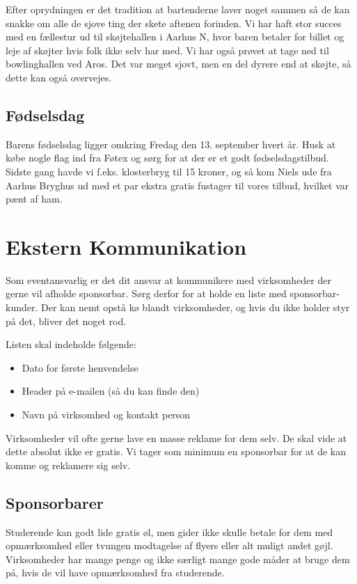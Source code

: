 Efter oprydningen er det tradition at bartenderne laver noget sammen så de kan snakke om alle de sjove ting der skete aftenen forinden. Vi har haft stor succes med en fællestur ud til skøjtehallen i Aarhus N, hvor baren betaler for billet og leje af skøjter hvis folk ikke selv har med. Vi har også prøvet at tage ned til bowlinghallen ved Aros. Det var meget sjovt, men en del dyrere end at skøjte, så dette kan også overvejes.

\subsection*{Fødselsdag}
Barens fødselsdag ligger omkring Fredag den 13. september hvert år. Husk at købe nogle flag ind fra Føtex og sørg for at der er et godt fødselsdagstilbud. Sidste gang havde vi f.eks. klosterbryg til 15 kroner, og så kom Niels ude fra Aarhus Bryghus ud med et par ekstra gratis fustager til vores tilbud, hvilket var pænt af ham.


\section*{Ekstern Kommunikation}
\label{sec:ekst-komm}

Som eventansvarlig er det dit ansvar at kommunikere med virksomheder
der gerne vil afholde sponsorbar. Sørg derfor for at holde en liste
med sponsorbar-kunder. Der kan nemt opstå kø blandt virksomheder, og
hvis du ikke holder styr på det, bliver det noget rod.

Listen skal indeholde følgende:
\begin{itemize}
\item Dato for første henvendelse
\item Header på e-mailen (så du kan finde den)
\item Navn på virksomhed og kontakt person
\end{itemize}

Virksomheder vil ofte gerne lave en masse reklame for dem selv. De skal vide at dette absolut ikke er gratis. Vi tager som minimum en sponsorbar for at de kan komme og reklamere sig selv.

\subsection{Sponsorbarer}
\label{sec:sponsorbarer}

Studerende kan godt lide gratis øl, men gider ikke skulle betale for
dem med opmærksomhed eller tvungen modtagelse af flyers eller alt
muligt andet gøjl. Virksomheder har mange penge og ikke særligt mange
gode måder at bruge dem på, hvis de vil have opmærksomhed fra
studerende.

